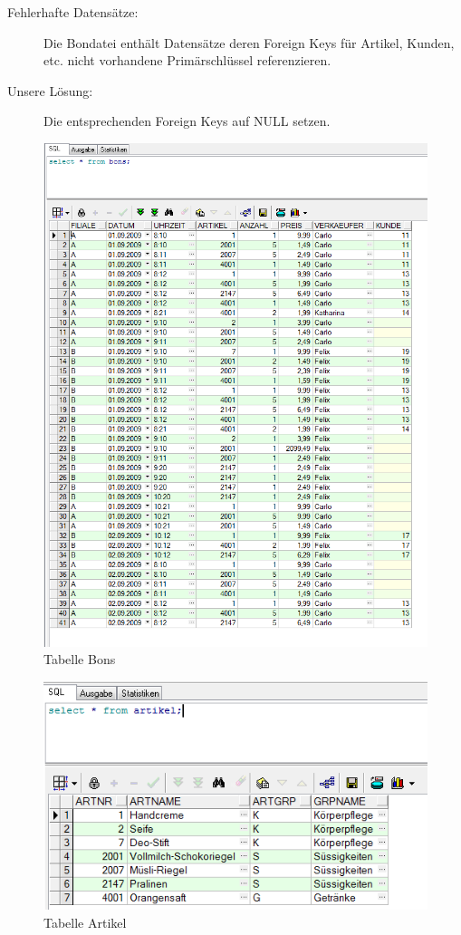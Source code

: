 \documentclass{scrreprt}
\begin{document}
\begin{description}
  \item[Fehlerhafte Datensätze:] Die Bondatei enthält Datensätze deren Foreign Keys für Artikel, Kunden, etc. nicht vorhandene Primärschlüssel referenzieren.
  \item[Unsere Lösung:] Die entsprechenden Foreign Keys auf NULL setzen.
\end{description}

\begin{figure}
  \centering
  \includegraphics[width=\textwidth]{screenshots/bons.png}
  \caption{Tabelle Bons}
\end{figure}

\begin{figure}
  \centering
  \includegraphics{screenshots/artikel.png}
  \caption{Tabelle Artikel}
\end{figure}
\end{document}
